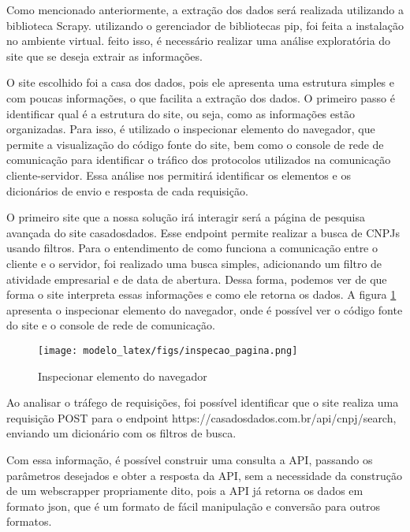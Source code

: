 Como mencionado anteriormente, a extração dos dados será realizada utilizando a biblioteca Scrapy. utilizando o gerenciador de bibliotecas pip, foi feita a instalação no ambiente virtual. feito isso, é necessário realizar uma análise exploratória do site que se deseja extrair as informações.

O site escolhido foi a casa dos dados, pois ele apresenta uma estrutura simples e com poucas informações, o que facilita a extração dos dados. O primeiro passo é identificar qual é a estrutura do site, ou seja, como as informações estão organizadas. Para isso, é utilizado o inspecionar elemento do navegador, que permite a visualização do código fonte do site, bem como o console de rede de comunicação para identificar o tráfico dos protocolos utilizados na comunicação cliente-servidor. Essa análise nos permitirá identificar os elementos e os dicionários de envio e resposta de cada requisição.

O primeiro site que a nossa solução irá interagir será a página de pesquisa avançada do site casadosdados. Esse endpoint permite realizar a busca de CNPJs usando filtros. Para o entendimento de como funciona a comunicação entre o cliente e o servidor, foi realizado uma busca simples, adicionando um filtro de atividade empresarial e de data de abertura. Dessa forma, podemos ver de que forma o site interpreta essas informações e como ele retorna os dados. A figura \ref{fig:inspecao_pagina} apresenta o inspecionar elemento do navegador, onde é possível ver o código fonte do site e o console de rede de comunicação.

\begin{figure}[H]
    \centering
    \texttt{[image: modelo\_latex/figs/inspecao\_pagina.png]}
    \caption{Inspecionar elemento do navegador}
    \label{fig:inspecao_pagina}

\end{figure}

Ao analisar o tráfego de requisições, foi possível identificar que o site realiza uma requisição POST para o endpoint https://casadosdados.com.br/api/cnpj/search, enviando um dicionário com os filtros de busca.

Com essa informação, é possível construir uma consulta a API, passando os parâmetros desejados e obter a resposta da API, sem a necessidade da construção de um webscrapper propriamente dito, pois a API já retorna os dados em formato json, que é um formato de fácil manipulação e conversão para outros formatos.

